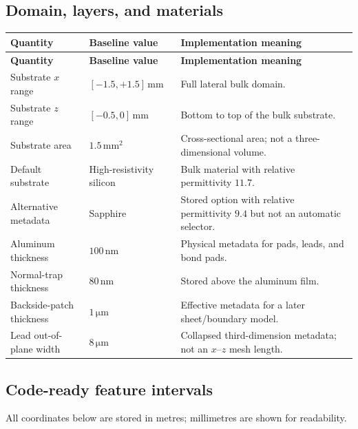 \documentclass[11pt]{article}
\begin{document}
\subsection{Domain, layers, and materials}

\begin{longtable}{>{\RaggedRight\arraybackslash}p{} >{\RaggedRight\arraybackslash}p{} >{\RaggedRight\arraybackslash}p{}}
\toprule
\textbf{Quantity} & \textbf{Baseline value} & \textbf{Implementation meaning} \\
\midrule
\endfirsthead
\toprule
\textbf{Quantity} & \textbf{Baseline value} & \textbf{Implementation meaning} \\
\midrule
\endhead
Substrate $x$ range & $[-1.5,+1.5]\,\mathrm{mm}$ & Full lateral bulk domain. \\
Substrate $z$ range & $[-0.5,0]\,\mathrm{mm}$ & Bottom to top of the bulk substrate. \\
Substrate area & $1.5\,\mathrm{mm^2}$ & Cross-sectional area; not a three-dimensional volume. \\
Default substrate & High-resistivity silicon & Bulk material with relative permittivity $11.7$. \\
Alternative metadata & Sapphire & Stored option with relative permittivity $9.4$ but not an automatic selector. \\
Aluminum thickness & $100\,\mathrm{nm}$ & Physical metadata for pads, leads, and bond pads. \\
Normal-trap thickness & $80\,\mathrm{nm}$ & Stored above the aluminum film. \\
Backside-patch thickness & $1\,\mathrm{\mu m}$ & Effective metadata for a later sheet/boundary model. \\
Lead out-of-plane width & $8\,\mathrm{\mu m}$ & Collapsed third-dimension metadata; not an $x$--$z$ mesh length. \\
\bottomrule
\end{longtable}

\subsection{Code-ready feature intervals}

All coordinates below are stored in metres; millimetres are shown for readability.
\end{document}
